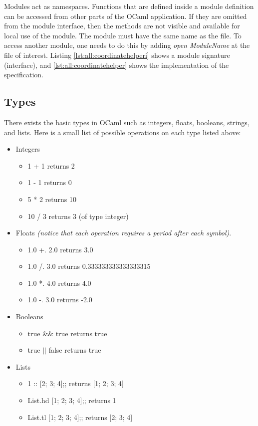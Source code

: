 Modules act as namespaces. Functions that are defined inside a module
definition can be accessed from other parts of the OCaml application. If they
are omitted from the module interface, then the methods are not visible and
available for local use of the module. The module must have the same name as
the file. To access another module, one needs to do this by adding \textit{open
ModuleName} at the file of interest. Listing \ref{lst:all:coordinatehelperi}
shows a module signature (interface), and \ref{lst:all:coordinatehelper} shows
the implementation
of the specification.

\subsection{Types}
There exists the basic types in OCaml such as integers, floats, booleans, strings, and lists. Here is
a small list of possible operations on each type listed above:

\begin{itemize}

\item{Integers}
\begin{itemize}
\item 1 + 1 returns 2
\item 1 - 1 returns 0
\item 5 * 2 returns 10
\item 10 / 3 returns 3 (of type integer)\end{itemize}

\item{Floats} \textit{(notice that each operation requires a period after each symbol)}.
\begin{itemize}
\item 1.0 +. 2.0 returns 3.0
\item 1.0 /. 3.0 returns 0.333333333333333315
\item 1.0 *. 4.0 returns 4.0
\item 1.0 -. 3.0 returns -2.0 \end{itemize}

\item{Booleans}\begin{itemize}
\item true \&\& true returns true
\item true $\vert\vert$ false returns true \end{itemize}

\item{Lists} \begin{itemize}
\item 1 :: [2; 3; 4];; returns [1; 2; 3; 4]
\item List.hd [1; 2; 3; 4];; returns 1
\item List.tl [1; 2; 3; 4];; returns [2; 3; 4]
\end{itemize}
\end{itemize}

